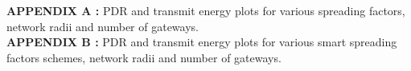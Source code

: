 \singlespacing

\textbf{APPENDIX A :} PDR and transmit energy plots for various spreading factors, network radii and number of gateways.\\
\textbf{APPENDIX B :} PDR and transmit energy plots for various smart spreading factors schemes, network radii and number of gateways.\\
